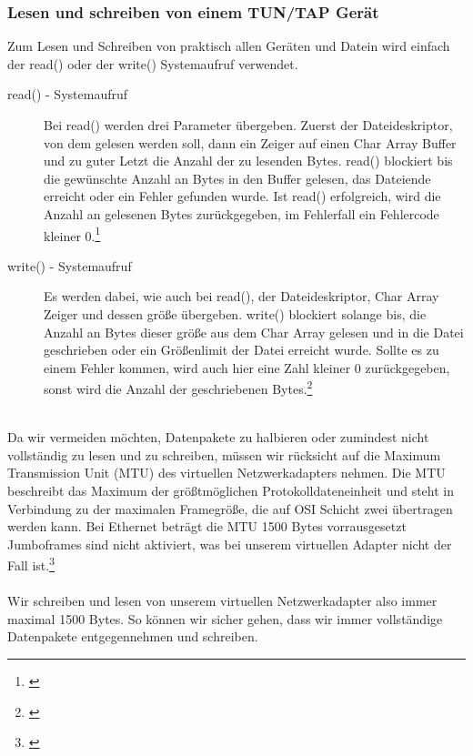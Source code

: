 \subsubsection{Lesen und schreiben von einem TUN/TAP Gerät}
Zum Lesen und Schreiben von praktisch allen Geräten und Datein wird einfach der read() oder der write() Systemaufruf verwendet. 
\\
\begin{description}
    \item[read() - Systemaufruf] Bei read() werden drei Parameter übergeben. Zuerst der Dateideskriptor, von dem gelesen werden soll, dann ein Zeiger auf einen Char Array Buffer und zu guter Letzt die Anzahl der zu lesenden Bytes. read() blockiert bis die gewünschte Anzahl an Bytes in den Buffer gelesen, das Dateiende erreicht oder ein Fehler gefunden wurde. Ist read() erfolgreich, wird die Anzahl an gelesenen Bytes zurückgegeben, im Fehlerfall ein Fehlercode kleiner 0.\footnote[1]{\cite[Vgl.][]{SRV11}}
    \\%
    \item[write() - Systemaufruf] Es werden dabei, wie auch bei read(), der Dateideskriptor, Char Array Zeiger und dessen größe übergeben. write() blockiert solange bis, die Anzahl an Bytes dieser größe aus dem Char Array gelesen und in die Datei geschrieben oder ein Größenlimit der Datei erreicht wurde. Sollte es zu einem Fehler kommen, wird auch hier eine Zahl kleiner 0 zurückgegeben, sonst wird die Anzahl der geschriebenen Bytes.\footnote[2]{\cite[Vgl.][]{SRV12}}
\end{description}
\ \\
Da wir vermeiden möchten, Datenpakete zu halbieren oder zumindest nicht vollständig zu lesen und zu schreiben, müssen wir rücksicht auf die Maximum Transmission Unit (MTU) des virtuellen Netzwerkadapters nehmen. Die MTU beschreibt das Maximum der größtmöglichen Protokolldateneinheit und steht in Verbindung zu der maximalen Framegröße, die auf OSI Schicht zwei übertragen werden kann. Bei Ethernet beträgt die MTU 1500 Bytes vorrausgesetzt Jumboframes sind nicht aktiviert, was bei unserem virtuellen Adapter nicht der Fall ist.\footnote[3]{\cite[Vgl.][]{SRV13}}
\\\\
Wir schreiben und lesen von unserem virtuellen Netzwerkadapter also immer maximal 1500 Bytes. So können wir sicher gehen, dass wir immer vollständige Datenpakete entgegennehmen und schreiben.
